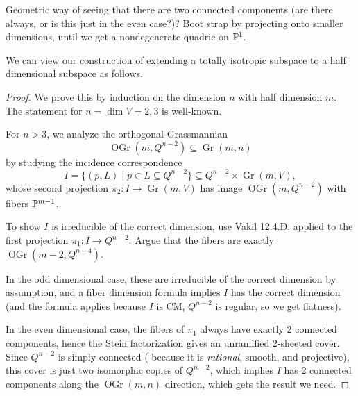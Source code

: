 \documentclass[12pt]{article}
\DeclareMathOperator{\OGr}{OGr}
\DeclareMathOperator{\Gr}{Gr}
\begin{document}
Geometric way of seeing that there are two connected components (are there always, or is this just in the even case?)? Boot strap by projecting onto smaller dimensions, until we get a nondegenerate quadric on $\P^1$.

We can view our construction of extending a totally isotropic subspace to a half dimensional subspace as follows.


\begin{proof}
    We prove this by induction on the dimension $n$ with half dimension $m$. The statement for $n=\dim V=2,3$ is well-known.
    
    For $n>3$, we analyze the orthogonal Grassmannian
    \[\OGr(m,Q^{n-2}) \subseteq \Gr(m,n)\]
    by studying the incidence correspondence
    \[I = \{(p,L) \mid p\in L \subseteq Q^{n-2}\} \subseteq Q^{n-2}\times \Gr(m,V),\]
    whose second projection $\pi_2: I \to \Gr(m,V)$ has image $\OGr(m,Q^{n-2})$ with fibers $\P^{m-1}$.

    To show $I$ is irreducible of the correct dimension, use Vakil 12.4.D, applied to the first projection $\pi_1: I \to Q^{n-2}$. Argue that the fibers are exactly $\OGr(m-2,Q^{n-4})$.
    
    In the odd dimensional case, these are irreducible of the correct dimension by assumption, and a fiber dimension formula implies $I$ has the correct dimension (and the formula applies because $I$ is CM, $Q^{n-2}$ is regular, so we get flatness).

    In the even dimensional case, the fibers of $\pi_1$ always have exactly 2 connected components, hence the Stein factorization gives an unramified 2-sheeted cover. Since $Q^{n-2}$ is simply connected ({\color{red} because it is \textit{rational}, smooth, and projective}), this cover is just two isomorphic copies of $Q^{n-2}$, which implies $I$ has 2 connected components along the $\OGr(m,n)$ direction, which gets the result we need.
    
\end{proof}
\end{document}
